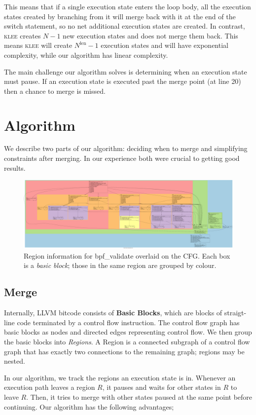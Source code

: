 \documentclass[12pt,a4paper]{article}
\newcommand{\klee}{\textsc{klee }}
\begin{document}
This means that if a single execution state enters the loop body, all the execution states created by branching from it will merge back with it at the end of the switch statement, so no net additional execution states are created. In contrast, \klee creates $N-1$ new execution states and does not merge them back. This means \klee will create $N^\text{len} - 1$ execution states and will have exponential complexity, while our algorithm has linear complexity.

The main challenge our algorithm solves is determining when an execution state must pause. If an execution state is executed past the merge point (at line 20) then a chance to merge is missed.

\section{Algorithm}\label{algorithm}
We describe two parts of our algorithm: deciding when to merge and simplifying constraints after merging. In our experience both were crucial to getting good results.
\begin{figure}
  \centering
    \includegraphics[width=\textwidth]{reg.png}
  \caption{Region information for bpf\_validate overlaid on the CFG. Each box is a \emph{basic block}; those in the same region are grouped by colour.}
\end{figure}

\subsection{Merge}
Internally, LLVM bitcode consists of \textbf{Basic Blocks}, which are blocks of straigt-line code terminated by a control flow instruction. The control flow graph has basic blocks as nodes and directed edges representing control flow. We then group the basic blocks into \emph{Regions}. A Region is a connected subgraph of a control flow graph that has exactly two connections to the remaining graph; regions may be nested. 

In our algorithm, we track the regions an execution state is in. Whenever an execution path leaves a region $R$, it pauses and waits for other states in $R$ to leave $R$. Then, it tries to merge with other states paused at the same point before continuing. Our algorithm has the following advantages;
\end{document}
